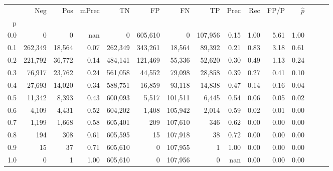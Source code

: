 \begin{tabular}{rrrrrrrrrrrrrrr}
\toprule
{} &      Neg &     Pos & mPrec &       TN &       FP &       FN &       TP &  Prec &   Rec &  FP/P & $\hat{p}$ \\
p   &          &         &       &          &          &          &          &       &       &       &           \\
\midrule
0.0 &        0 &       0 &   nan &        0 &  605,610 &        0 &  107,956 &  0.15 &  1.00 &  5.61 &      1.00 \\
0.1 &  262,349 &  18,564 &  0.07 &  262,349 &  343,261 &   18,564 &   89,392 &  0.21 &  0.83 &  3.18 &      0.61 \\
0.2 &  221,792 &  36,772 &  0.14 &  484,141 &  121,469 &   55,336 &   52,620 &  0.30 &  0.49 &  1.13 &      0.24 \\
0.3 &   76,917 &  23,762 &  0.24 &  561,058 &   44,552 &   79,098 &   28,858 &  0.39 &  0.27 &  0.41 &      0.10 \\
0.4 &   27,693 &  14,020 &  0.34 &  588,751 &   16,859 &   93,118 &   14,838 &  0.47 &  0.14 &  0.16 &      0.04 \\
0.5 &   11,342 &   8,393 &  0.43 &  600,093 &    5,517 &  101,511 &    6,445 &  0.54 &  0.06 &  0.05 &      0.02 \\
0.6 &    4,109 &   4,431 &  0.52 &  604,202 &    1,408 &  105,942 &    2,014 &  0.59 &  0.02 &  0.01 &      0.00 \\
0.7 &    1,199 &   1,668 &  0.58 &  605,401 &      209 &  107,610 &      346 &  0.62 &  0.00 &  0.00 &      0.00 \\
0.8 &      194 &     308 &  0.61 &  605,595 &       15 &  107,918 &       38 &  0.72 &  0.00 &  0.00 &      0.00 \\
0.9 &       15 &      37 &  0.71 &  605,610 &        0 &  107,955 &        1 &  1.00 &  0.00 &  0.00 &      0.00 \\
1.0 &        0 &       1 &  1.00 &  605,610 &        0 &  107,956 &        0 &   nan &  0.00 &  0.00 &      0.00 \\
\bottomrule
\end{tabular}
